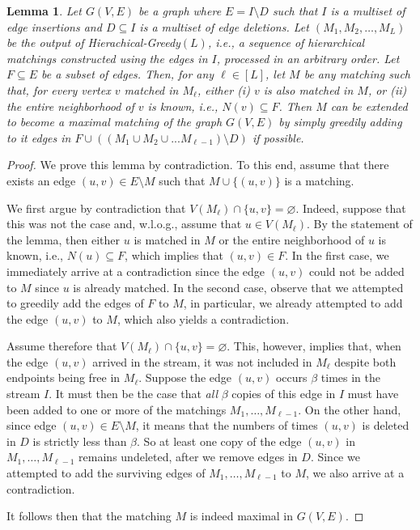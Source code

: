 \documentclass[11pt,a4paper]{article}
\newtheorem{lemma}{Lemma}
\begin{document}
\begin{lemma}\label{lem:key-1}
Let $G(V,E)$ be a graph where $E = I \setminus D$ such that $I$ is a multiset of edge insertions and $D \subseteq I$ is a multiset of edge deletions. Let $(M_1, M_2, \dots, M_{L})$ be the output of \textsf{Hierachical-Greedy}$(L)$, i.e., a sequence of hierarchical matchings constructed using the edges in $I$, processed in an arbitrary order. Let $F \subseteq E$ be a subset of edges. Then, for any $\ell \in [L]$, let $M$ be any matching such that, for every vertex $v$ matched in $M_{\ell}$, either (i) $v$ is also matched in $M$, or (ii) the entire neighborhood of $v$ is known, i.e., $N(v) \subseteq F$. Then $M$ can be extended to become a maximal matching of the graph $G(V,E)$ by simply greedily adding to it edges in $F \cup \left( (M_1 \cup M_2 \cup ... M_{\ell-1}) \setminus D \right)$ if possible.
\end{lemma}
\begin{proof}
    We prove this lemma by contradiction. To this end, assume that there exists an edge $(u,v) \in E \setminus M$ such that $M \cup \{ (u, v) \}$ is a matching. 
    
    We first argue by contradiction that $V(M_{\ell}) \cap \{u,v\} = \varnothing$. Indeed, suppose that this was not the case and, w.l.o.g., assume that $u \in V(M_{\ell})$. By the statement of the lemma, then either $u$ is matched in $M$ or the entire neighborhood of $u$ is known, i.e., $N(u) \subseteq F$, which implies that $(u, v) \in F$. In the first case, we immediately arrive at a contradiction since the edge $(u,v)$ could not be added to $M$ since $u$ is already matched. In the second case, observe that we attempted to greedily add the edges of $F$ to $M$, in particular, we already attempted to add the edge $(u,v)$ to $M$, which also yields a contradiction.

    Assume therefore that $V(M_{\ell}) \cap \{u,v\} = \varnothing$. This, however, implies that, when the edge $(u,v)$ arrived in the stream, it was not included in $M_{\ell}$ despite both endpoints being free in $M_{\ell}$. Suppose the edge $(u,v)$ occurs $\beta$ times in the stream $I$. It must then be the case that {\em all} $\beta$ copies of this edge in $I$ must have been added to one or more of the matchings $M_1, \dots, M_{\ell-1}$. On the other hand, since edge $(u,v) \in E \setminus M$, it means that the numbers of times $(u,v)$ is deleted in $D$ is strictly less than $\beta$. So at least one copy of the edge $(u,v)$ in $M_1, \dots, M_{\ell-1}$ remains undeleted, after we remove edges in $D$. Since we attempted to add the surviving edges of $M_1, \dots, M_{\ell-1}$ to $M$, we also arrive at a contradiction. 

   It follows then that the matching $M$ is indeed maximal in $G(V,E)$.

    




\end{proof}
\end{document}
